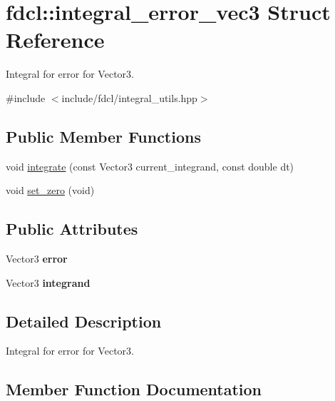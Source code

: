 \hypertarget{structfdcl_1_1integral__error__vec3}{}\section{fdcl\+:\+:integral\+\_\+error\+\_\+vec3 Struct Reference}
\label{structfdcl_1_1integral__error__vec3}


Integral for error for Vector3.  




{\ttfamily \#include $<$include/fdcl/integral\+\_\+utils.\+hpp$>$}

\subsection*{Public Member Functions}
\begin{DoxyCompactItemize}
\item 
void \hyperlink{structfdcl_1_1integral__error__vec3_a3d084a771307cfb5743dc0907fa1e0f0}{integrate} (const Vector3 current\+\_\+integrand, const double dt)
\item 
void \hyperlink{structfdcl_1_1integral__error__vec3_a0f4a292981089c7a7bc95dbf22dd5d8d}{set\+\_\+zero} (void)
\end{DoxyCompactItemize}
\subsection*{Public Attributes}
\begin{DoxyCompactItemize}
\item 
Vector3 {\bfseries error}\hypertarget{structfdcl_1_1integral__error__vec3_a6cb9c53fc461d9782f9e68f38fb1938d}{}\label{structfdcl_1_1integral__error__vec3_a6cb9c53fc461d9782f9e68f38fb1938d}

\item 
Vector3 {\bfseries integrand}\hypertarget{structfdcl_1_1integral__error__vec3_aeb48e72b8359569cb8f7c5fb3fdd0a73}{}\label{structfdcl_1_1integral__error__vec3_aeb48e72b8359569cb8f7c5fb3fdd0a73}

\end{DoxyCompactItemize}


\subsection{Detailed Description}
Integral for error for Vector3. 

\subsection{Member Function Documentation}
